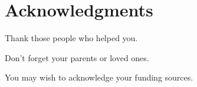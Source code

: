 
\chapter{Acknowledgments}

Thank those people who helped you. 

Don't forget your parents or loved ones.

You may wish to acknowledge your funding sources.
